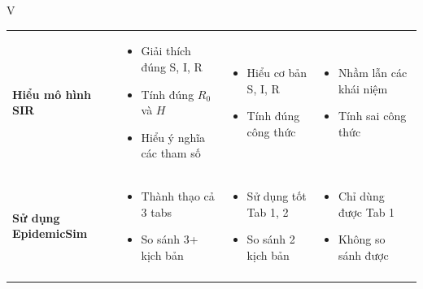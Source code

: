 \documentclass[12pt,a4paper]{article}
\begin{document}
\begin{competitionsection}{V}
\begin{tabularx}{\linewidth}{@{} >{\raggedright\arraybackslash}p{3cm} >{\raggedright\arraybackslash}X >{\raggedright\arraybackslash}X >{\raggedright\arraybackslash}X @{}}
    \textbf{Hiểu mô hình SIR} 
    & 
    \begin{itemize}[leftmargin=*,noitemsep,topsep=1ex]
        \item Giải thích đúng S, I, R
        \item Tính đúng $R_0$ và $H$
        \item Hiểu ý nghĩa các tham số
    \end{itemize}
    & 
    \begin{itemize}[leftmargin=*,noitemsep,topsep=1ex]
        \item Hiểu cơ bản S, I, R
        \item Tính đúng công thức
    \end{itemize}
    & 
    \begin{itemize}[leftmargin=*,noitemsep,topsep=1ex]
        \item Nhầm lẫn các khái niệm
        \item Tính sai công thức
    \end{itemize} \\
    \addlinespace
    
    \textbf{Sử dụng EpidemicSim} 
    & 
    \begin{itemize}[leftmargin=*,noitemsep,topsep=1ex]
        \item Thành thạo cả 3 tabs
        \item So sánh 3+ kịch bản
    \end{itemize}
    & 
    \begin{itemize}[leftmargin=*,noitemsep,topsep=1ex]
        \item Sử dụng tốt Tab 1, 2
        \item So sánh 2 kịch bản
    \end{itemize}
    & 
    \begin{itemize}[leftmargin=*,noitemsep,topsep=1ex]
        \item Chỉ dùng được Tab 1
        \item Không so sánh được
    \end{itemize} \\
    \addlinespace
    

\end{tabularx}
\end{competitionsection}
\end{document}
